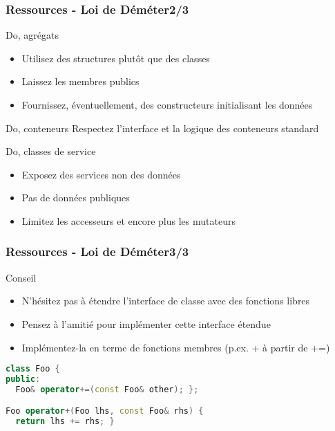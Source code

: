 \documentclass[C++.tex]{subfiles}
\begin{document}
\begin{frame}
	\frametitle{Ressources - Loi de Déméter\titlehfill{}2/3}
	\begin{exampleblock}{Do, agrégats}
		\begin{itemize}
			\item Utilisez des structures plutôt que des classes
			\item Laissez les membres publics
			\item Fournissez, éventuellement, des constructeurs initialisant les données
		\end{itemize}

	\end{exampleblock}

	\begin{exampleblock}{Do, conteneurs}
		Respectez l'interface et la logique des conteneurs standard

	\end{exampleblock}

	\begin{exampleblock}{Do, classes de service}
		\begin{itemize}
			\item Exposez des services non des données
			\item Pas de données publiques
			\item Limitez les accesseurs et encore plus les mutateurs
		\end{itemize}
	\end{exampleblock}
\end{frame}

\begin{frame}[fragile]
	\frametitle{Ressources - Loi de Déméter\titlehfill{}3/3}
	\begin{block}{Conseil}
		\begin{itemize}
			\item N'hésitez pas à étendre l'interface de classe avec des fonctions libres


			\item Pensez à l'amitié pour implémenter cette interface étendue
			\item Implémentez-la en terme de fonctions membres (p.ex. + à partir de +=)
		\end{itemize}
	\end{block}

	\begin{lstlisting}[language=C++]
class Foo {
public:
  Foo& operator+=(const Foo& other); };

Foo operator+(Foo lhs, const Foo& rhs) {
  return lhs += rhs; }\end{lstlisting}
\end{frame}
\end{document}
